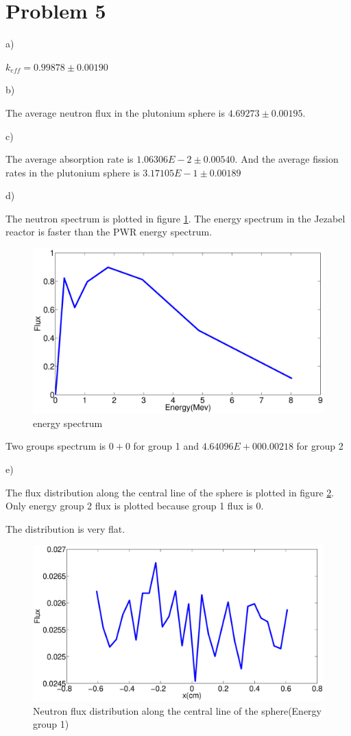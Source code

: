 \documentclass[a4paper, 12pt]{article} %
\begin{document}
\section*{Problem 5}

a)

$k_{eff} = 0.99878 \pm 0.00190$

b)

The average neutron flux in the plutonium sphere is $4.69273\pm0.00195$.

c)

The average absorption rate is $1.06306E-2 \pm 0.00540$. And the average fission rates in the plutonium sphere is $3.17105E-1 \pm 0.00189$

d)

The neutron spectrum is plotted in figure \ref{energy_spec}. The energy spectrum in the Jezabel reactor is faster than the PWR energy spectrum. 

\begin{figure}
\caption{energy spectrum}
\label{energy_spec}
\includegraphics[width = \textwidth]{prob5_energy.eps}
\end{figure}



Two groups spectrum is
$0+0$ for group 1 and 
$4.64096E+00 0.00218$ for group 2

e)

The flux distribution along the central line of the sphere is plotted in figure \ref{flux_x}. Only energy group 2 flux is plotted because group 1 flux is 0.

The distribution is very flat. 
\begin{figure}
\label{flux_x}
\caption{Neutron flux distribution along the central line of the sphere(Energy group 1)}
\includegraphics[width = \textwidth]{prob5_x.eps}
\end{figure}
\end{document}

